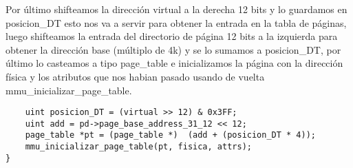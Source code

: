 Por último shifteamos la dirección virtual a la derecha 12 bits y lo guardamos en posicion\_DT esto nos va a servir para obtener la entrada en la tabla de páginas, luego shifteamos la entrada del directorio de página 12 bits a la izquierda para obtener la dirección base (múltiplo de 4k) y se lo sumamos a posicion\_DT, por último lo casteamos a tipo page\_table e inicializamos la página con la dirección física y los atributos que nos habian pasado usando de vuelta mmu\_inicializar\_page\_table.

\begin{codesnippet}
\begin{verbatim}
    uint posicion_DT = (virtual >> 12) & 0x3FF;
    uint add = pd->page_base_address_31_12 << 12;
    page_table *pt = (page_table *)  (add + (posicion_DT * 4));                  
    mmu_inicializar_page_table(pt, fisica, attrs);
}
\end{verbatim}
\end{codesnippet}